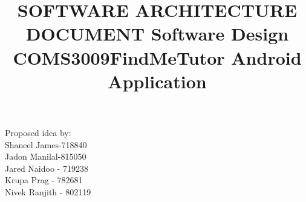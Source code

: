 \documentclass[12pt]{article}
\begin{document}
\title{\textbf{SOFTWARE ARCHITECTURE DOCUMENT }}
\maketitle

\begin{center}
\title{\textbf{Software Design COMS3009}}
\maketitle
\end{center}
\begin{center}
\title{\textbf{FindMeTutor Android Application}}
\maketitle
\end{center}

\begin{center}
Proposed idea by:\\
Shaneel James-718840
\\Jadon Manilal-815050
\\Jared Naidoo - 719238
\\Krupa Prag - 782681
\\Nivek Ranjith - 802119
\end{center}


\newpage
\tableofcontents
\newpage
\end{document}
